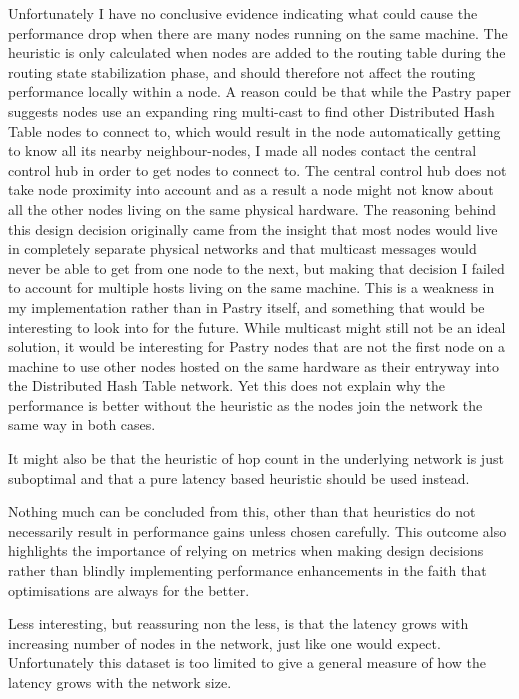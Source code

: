 Unfortunately I have no conclusive evidence indicating what could cause the performance drop when there are many nodes running on the same machine. The heuristic is only calculated when nodes are added to the routing table during the routing state stabilization phase, and should therefore not affect the routing performance locally within a node.
A reason could be that while the Pastry paper \cite{pastry} suggests nodes use an expanding ring multi-cast to find other Distributed Hash Table nodes to connect to, which would result in the node automatically getting to know all its nearby neighbour-nodes, I made all nodes contact the central control hub in order to get nodes to connect to. The central control hub does not take node proximity into account and as a result a node might not know about all the other nodes living on the same physical hardware. The reasoning behind this design decision originally came from the insight that most nodes would live in completely separate physical networks and that multicast messages would never be able to get from one node to the next, but making that decision I failed to account for multiple hosts living on the same machine.
This is a weakness in my implementation rather than in Pastry itself, and something that would be interesting to look into for the future. While multicast might still not be an ideal solution, it would be interesting for Pastry nodes that are not the first node on a machine to use other nodes hosted on the same hardware as their entryway into the Distributed Hash Table network.
Yet this does not explain why the performance is better without the heuristic as the nodes join the network the same way in both cases.

It might also be that the heuristic of hop count in the underlying network is just suboptimal and that a pure latency based heuristic should be used instead.

Nothing much can be concluded from this, other than that heuristics do not necessarily result in performance gains unless chosen carefully. This outcome also highlights the importance of relying on metrics when making design decisions rather than blindly implementing performance enhancements in the faith that optimisations are always for the better.

Less interesting, but reassuring non the less, is that the latency grows with increasing number of nodes in the network, just like one would expect. Unfortunately this dataset is too limited to give a general measure of how the latency grows with the network size.


